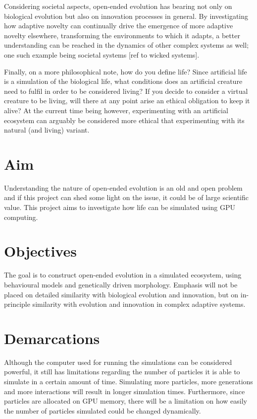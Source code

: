 Considering societal aspects, open-ended evolution has bearing not only on biological evolution but also on innovation processes in general. By investigating how adaptive novelty can continually drive the emergence of more adaptive novelty elsewhere, transforming the environments to which it adapts, a better understanding can be reached in the dynamics of other complex systems as well; one such example being societal systems [ref to wicked systems].

Finally, on a more philosophical note, how do you define life? Since artificial life is a simulation of the biological life, what conditions does an artificial creature need to fulfil in order to be considered living? If you decide to consider a virtual creature to be living, will there at any point arise an ethical obligation to keep it alive? At the current time being however, experimenting with an artificial ecosystem can arguably be considered more ethical that experimenting with its natural (and living) variant.

\section{Aim}
Understanding the nature of open-ended evolution is an old and open problem and if this project can shed some light on the issue, it could be of large scientific value. This project aims to investigate how life can be simulated using GPU computing.

\section{Objectives}
The goal is to construct open-ended evolution in a simulated ecosystem, using behavioural models and genetically driven morphology. Emphasis will not be placed on detailed similarity with biological evolution and innovation, but on in-principle similarity with evolution and innovation in complex adaptive systems.

\section{Demarcations}
Although the computer used for running the simulations can be considered powerful, it still has limitations regarding the number of particles it is able to simulate in a certain amount of time. Simulating more particles, more generations and more interactions will result in longer simulation times.  Furthermore, since particles are allocated on GPU memory, there will be a limitation on how easily the number of particles simulated could be changed dynamically.

